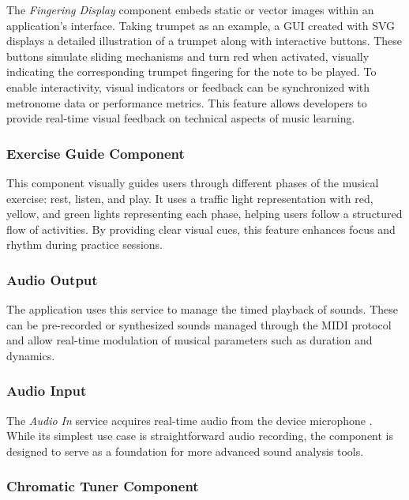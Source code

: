 \documentclass[runningheads]{llncs}
\begin{document}
The \textit{Fingering Display} component embeds static or vector images within an application’s interface. Taking trumpet as an example, a GUI created with SVG displays a detailed illustration of a trumpet along with interactive buttons. These buttons simulate sliding mechanisms and turn red when activated, visually indicating the corresponding trumpet fingering for the note to be played.
To enable interactivity, visual indicators or feedback can be synchronized with metronome data or performance metrics. This feature allows developers to provide real-time visual feedback on technical aspects of music learning.


\subsubsection{Exercise Guide Component}

This component visually guides users through different phases of the musical exercise: rest, listen, and play. It uses a traffic light representation with red, yellow, and green lights representing each phase, helping users follow a structured flow of activities. By providing clear visual cues, this feature enhances focus and rhythm during practice sessions.


\subsubsection{Audio Output}

The application uses this service to manage the timed playback of sounds. These can be pre-recorded or synthesized sounds managed through the MIDI protocol and allow real-time modulation of musical parameters such as duration and dynamics.


\subsubsection{Audio Input}

The \textit{Audio In} service acquires real-time audio from the device microphone%
. While its simplest use case is straightforward audio recording, the component is designed to serve as a foundation for more advanced sound analysis tools.


\subsubsection{Chromatic Tuner Component}
\end{document}
